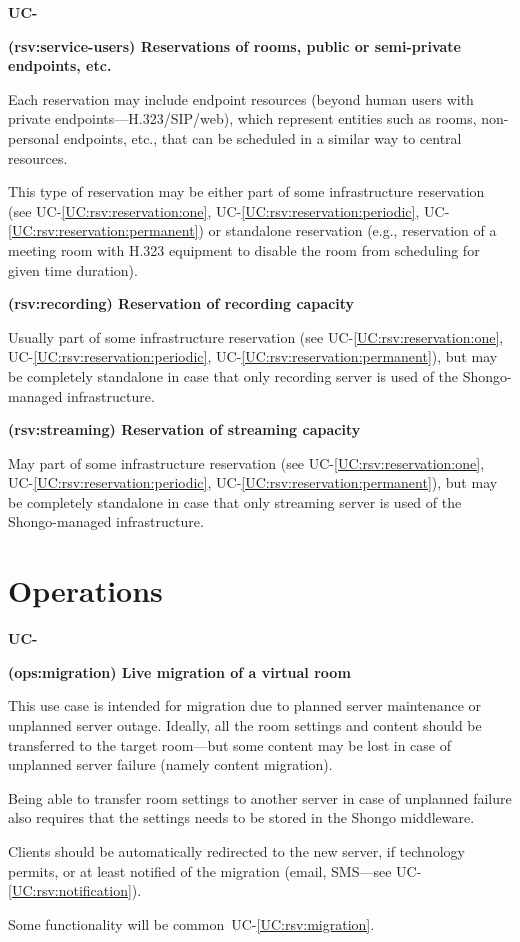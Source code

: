 \documentclass[a4paper]{report}
\makeatletter
\newcounter{UCcounter}
\newenvironment{UseCases}%
	{\begin{list}{\textbf{UC-\arabic{UCcounter}}}{\@nmbrlisttrue\def\@listctr{UCcounter}}}%
	{\end{list}}
\newcommand{\UClabel}[1]{\label{UC:#1}}
\newcommand{\UCref}[1]{UC-\ref{UC:#1}}
\newcommand{\UseCase}[2]{\item\UClabel{#2} \textbf{(#2) #1}\\ \nopagebreak}
\makeatother
\begin{document}
\begin{UseCases}
\UseCase{Reservations of rooms, public or semi-private endpoints,
etc.}{rsv:service-users}

Each reservation may include endpoint resources (beyond human users with
private endpoints---H.323/SIP/web), which represent entities such as rooms,
non-personal endpoints, etc., that can be scheduled in a similar way to central
resources.

This type of reservation may be either part of some infrastructure reservation
(see \UCref{rsv:reservation:one}, \UCref{rsv:reservation:periodic},
\UCref{rsv:reservation:permanent}) or standalone reservation (e.g., reservation
of a meeting room with H.323 equipment to disable the room from scheduling for
given time duration).


\UseCase{Reservation of recording capacity}{rsv:recording}

Usually part of some infrastructure reservation (see
\UCref{rsv:reservation:one}, \UCref{rsv:reservation:periodic},
\UCref{rsv:reservation:permanent}), but may be completely standalone in case
that only recording server is used of the Shongo-managed infrastructure.


\UseCase{Reservation of streaming capacity}{rsv:streaming}

May part of some infrastructure reservation (see \UCref{rsv:reservation:one},
\UCref{rsv:reservation:periodic}, \UCref{rsv:reservation:permanent}), but may
be completely standalone in case that only streaming server is used of the
Shongo-managed infrastructure.

\end{UseCases}


\section{Operations}

\begin{UseCases}

\UseCase{Live migration of a virtual room}{ops:migration}

This use case is intended for migration due to planned server maintenance or
unplanned server outage.  Ideally, all the room settings and content should be
transferred to the target room---but some content may be lost in case of
unplanned server failure (namely content migration).

Being able to transfer room settings to another server in case of unplanned
failure also requires that the settings needs to be stored in the Shongo
middleware.

Clients should be automatically redirected to the new server, if technology
permits, or at least notified of the migration (email, SMS---see
\UCref{rsv:notification}).

Some functionality will be common~\UCref{rsv:migration}.

\end{UseCases}
\end{document}

